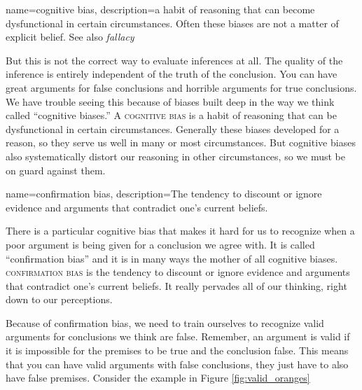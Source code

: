 

{
name=cognitive bias,
description={a habit of reasoning that can become dysfunctional in certain circumstances. Often these biases are not a matter of explicit belief. See also \emph{fallacy}}
}

But this is not the correct way to evaluate inferences at all. The quality of the inference is entirely independent of the truth of the conclusion. You can have great arguments for false conclusions and horrible arguments for true conclusions. We have trouble seeing this because of biases built deep in the way we think called ``cognitive biases.'' A  \textsc{\gls{cognitive bias}}\label{def:cognitive_bias} is a habit of reasoning that can be dysfunctional in certain circumstances. Generally these biases developed for a reason, so they serve us well in many or most circumstances. But cognitive biases also systematically distort our reasoning in other circumstances, so we must be on guard against them.

{
name=confirmation bias,
description={The tendency to discount or ignore evidence and arguments that contradict one's current beliefs.}
}

There is a particular cognitive bias that makes it hard for us to recognize when a poor argument is being given for a conclusion we agree with. It is called ``confirmation bias'' and it is in many ways the mother of all cognitive biases.  \textsc{\Gls{confirmation bias}} \label{def:confirmation_bias} is the tendency to discount or ignore evidence and arguments that contradict one's current beliefs. It really pervades all of our thinking, right down to our perceptions.

Because of confirmation bias, we need to train ourselves to recognize valid arguments for conclusions we think are false. Remember, an argument is valid if it is impossible for the premises to be true and the conclusion false. This means that you can have valid arguments with false conclusions, they just have to also have false premises. Consider the example in Figure \ref{fig:valid_oranges}


\begin{kormanize}
\end{kormanize}


